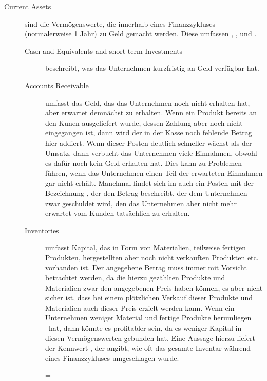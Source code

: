 \begin{description}
    \item[Current Assets] sind die Vermögenswerte, die innerhalb eines Finanzzykluses (normalerweise 1 Jahr) zu Geld gemacht werden.
        Diese umfassen , ,  und .
        \begin{description}
            \item[Cash and Equivalents and short-term-Investments] beschreibt, was das Unternehmen kurzfristig an Geld verfügbar hat.
            \item[Accounts Receivable] umfasst das Geld, das das Unternehmen noch nicht erhalten hat, aber erwartet demnächst zu erhalten.
                Wenn ein Produkt bereits an den Kunen ausgeliefert wurde, dessen Zahlung aber noch nicht eingegangen ist, dann wird der in der Kasse noch fehlende Betrag hier addiert.
                Wenn dieser Posten deutlich schneller wächst als der Umsatz, dann verbucht das Unternehmen viele Einnahmen, obwohl es dafür noch kein Geld erhalten hat.
                Dies kann zu Problemen führen, wenn das Unternehmen einen Teil der erwarteten Einnahmen gar nicht erhält.
                Manchmal findet sich im  auch ein Posten mit der Bezeichnung , der den Betrag beschreibt, der dem Unternehmen zwar geschuldet wird, den das Unternehmen aber nicht mehr erwartet vom Kunden tatsächlich zu erhalten.
            \item[Inventories] umfasst Kapital, das in Form von Materialien, teilweise fertigen Produkten, hergestellten aber noch nicht verkauften Produkten etc. vorhanden ist.
                Der angegebene Betrag muss immer mit Vorsicht betrachtet werden, da die hierzu gezählten Produkte und Materialien zwar den angegebenen Preis haben können, es aber nicht sicher ist, dass bei einem plötzlichen Verkauf dieser Produkte und Materialien auch dieser Preis erzielt werden kann.
                Wenn ein Unternehmen weniger Material und fertige Produkte \glqq herumliegen \grqq\ hat, dann könnte es profitabler sein, da es weniger Kapital in diesen Vermögenswerten gebunden hat.
                Eine Aussage hierzu liefert der Kennwert \textbf{}, der angibt, wie oft das gesamte Inventar während eines Finanzzykluses umgeschlagen wurde.
                \begin{formel}
                     = 

\end{formel}
\end{description}
\end{description}

